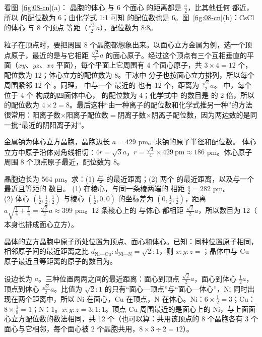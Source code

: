 看图~\ref{fig:08-cn}(a)： 晶胞的体心  与 6 个面心  的距离都是 $\frac a2$，比其他任何  都近，所以  的配位数为 6；由化学式 1:1 可知  的配位数也是 6。图~\ref{fig:08-cn}(b)：CsCl 的体心  与 8 个顶点  等距（$\frac{\sqrt3}{2}a$），配位数为 8:8。

粒子在顶点时，要把周围 8 个晶胞都想象出来。以面心立方金属为例，选一个顶点原子，最近的是与它相距 $\frac{\sqrt2}{2}a$ 的面心原子。经过这个顶点有三个互相垂直的平面（$xy$、$yz$、$xz$ 平面），每个平面上它周围有 4 个面心原子，共 $3\times4=12$ 个，配位数为 12；体心立方的配位数为 8。干冰中  分子也按面心立方排列，所以每个  周围紧邻 12 个 。同理， 中与一个  最近的  也有 12 个，距离为 $\frac{\sqrt2}{2}a$。 中，每个  位于 4 个  构成的四面体中心， 的配位数为 4；化学式中  的数目是  的 2 倍，所以  的配位数为 $4\times2=8$。最后这种“由一种离子的配位数和化学式推另一种”的方法很常用：阳离子数$\times$阳离子配位数$=$阴离子数$\times$阴离子配位数，因为两边数的是同一批“最近的阴阳离子对”。

\begin{liti}[基础练习]
金属钠为体心立方晶胞，晶胞边长 $a=429$ pm。求钠的原子半径和配位数。
\tcblower
\jie 体心立方中原子沿体对角线相切：$4r=\sqrt3a$，$r=\frac{\sqrt3}{4}\times429\ \text{pm}\approx186$ pm。体心原子周围 8 个顶点原子最近，配位数为 8。
\end{liti}

\begin{liti}[典型练习]
 晶胞边长为 564 pm。求：(1)  与  的最近距离；(2) 两个  的最近距离，以及与一个  最近且等距的  数目。
\tcblower
\jie (1)  在棱心，与同一条棱两端的  相距 $\frac a2=282$ pm。\\
(2) 体心  $(\frac12,\frac12,\frac12)$ 与棱心  $(\frac12,0,0)$ 的坐标差为 $(0,\frac12,\frac12)$，距离 $a\sqrt{\frac14+\frac14}=\frac{\sqrt2}{2}a\approx399$ pm。12 条棱心上的  与体心  都相距 $\frac{\sqrt2}{2}a$，所以数目为 12（ 本身也排成面心立方）。
\end{liti}

\begin{liti}
 晶体的立方晶胞中原子所处位置为顶点、面心和体心。已知：同种位置原子相同，相邻原子间的最近距离之比 $d_{\text{Ni—Cu}}:d_{\text{Ni—N}}=\sqrt2:1$，则 $x:y:z=$\tk；晶体中与 Cu 原子最近且等距离的原子的数目为\tk。

\tcblower
\jie 设边长为 $a$。三种位置两两之间的最近距离：面心到顶点 $\frac{\sqrt2}{2}a$，面心到体心 $\frac12a$，顶点到体心 $\frac{\sqrt3}{2}a$。比值为 $\sqrt2:1$ 的只有“面心—顶点”与“面心—体心”，Ni 同时出现在两个距离中，所以 Ni 在面心，Cu 在顶点，N 在体心。Ni：$6\times\frac12=3$；Cu：$8\times\frac18=1$；N：1。$x:y:z=3:1:1$。顶点 Cu 周围最近的是面心上的 Ni，与上面面心立方配位数的数法相同，共 12 个（也可以算：共用该顶点的 8 个晶胞各有 3 个面心与它相邻，每个面心被 2 个晶胞共用，$8\times3\div2=12$）。
\end{liti}

